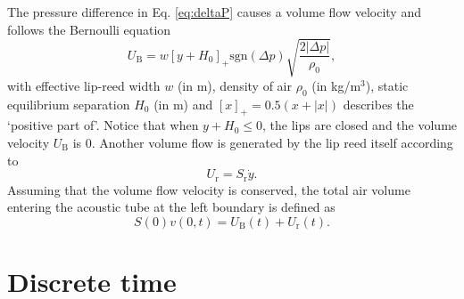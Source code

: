 The pressure difference in Eq. \eqref{eq:deltaP} causes a volume flow velocity and follows the Bernoulli equation
\begin{equation}
    U_\text{B} = w[y + H_0]_+\text{sgn}(\Delta p) \sqrt{\frac{2|\Delta p|}{\rho_0}},
\end{equation}
with effective lip-reed width $w$ (in m), density of air $\rho_0$ (in kg/m$^3$), static equilibrium separation $H_0$ (in m) and $[x]_+ = 0.5 (x + |x|)$ describes the `positive part of'. Notice that when $y + H_0 \leq 0$, the lips are closed and the volume velocity $U_\text{B}$ is 0. Another volume flow is generated by the lip reed itself according to
\begin{equation}
    U_\text{r} = S_\text{r} \dot y.
\end{equation}
Assuming that the volume flow velocity is conserved, the total air volume entering the acoustic tube at the left boundary is defined as
\begin{equation}
    S(0)v(0,t) = U_\text{B}(t) + U_\text{r}(t).
\end{equation} 
\section{Discrete time}
\def\nph{}
\def\nphSys{n+1/2}

